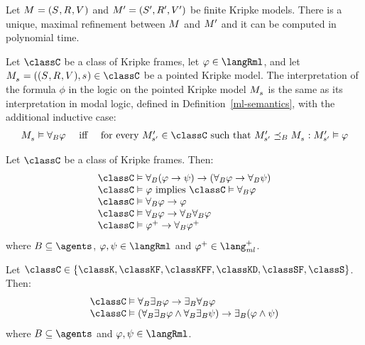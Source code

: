 
\begin{proposition}
Let $\kModelAndTuple$ and $\kModelAndTupleP$ be finite Kripke models.
There is a unique, maximal refinement between $\kModel$ and ${M^{\prime}_{}}$ and it can be computed in polynomial time.
\end{proposition}


\begin{definition}
Let $\classC$ be a class of Kripke frames, let $\phi \in \langRml$, and let $\kPModelAndTuple{\kStateS} \in \classC$ be a pointed Kripke model.
The interpretation of the formula $\phi$ in the logic \logicRmlC{} on the pointed Kripke model $\kPModel{\kStateS}$ is the same as its interpretation in modal logic, defined in Definition~\ref{ml-semantics}, with the additional inductive case:
$$
\begin{array}{lcl}
    \kPModel{\kStateS} \entails \allrefsBs \phi & \text{ iff } & \text{for every } \kPModelP{\kStateSP} \in \classC \text{ such that } \kPModelP{\kStateSP} \refinesBs \kPModel{\kStateS} : \kPModelP{\kStateSP} \entails \phi
\end{array}
$$
\end{definition}

\begin{proposition}
Let $\classC$ be a class of Kripke frames. Then:
$$
\begin{array}{l}
    \classC \entails \allrefsBs (\phi \implies \psi) \implies (\allrefsBs \phi \implies \allrefsBs \psi)\\
    \classC \entails \phi \text{ implies } \classC \entails \allrefsBs \phi\\
    \classC \entails \allrefsBs \phi \implies \phi\\
    \classC \entails \allrefsBs \phi \implies \allrefsBs \allrefsBs \phi\\
    \classC \entails \phi^+ \implies \allrefsBs \phi^+
\end{array}
$$
where $\agentsB \subseteq \agents$, $\phi, \psi \in \langRml$ and $\phi^+ \in \langMlPlus$.
\end{proposition}


\begin{proposition}
Let $\classC \in \{\classK, \classKF, \classKFF, \classKD, \classSF, \classS\}$. Then:
$$
\begin{array}{l}
    \classC \entails \allrefsBs \somerefsBs \phi \implies \somerefsBs \allrefsBs \phi\\
    \classC \entails (\allrefsBs \somerefsBs \phi \land \allrefsBs \somerefsBs \psi) \implies \somerefsBs (\phi \land \psi)
\end{array}
$$
where $\agentsB \subseteq \agents$ and $\phi, \psi \in \langRml$.
\end{proposition}

